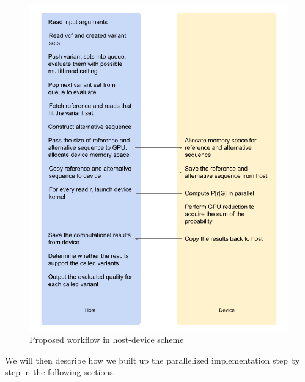 \documentclass{PHlab-thesis}
\begin{document}
\begin{figure}
	\centering
	\includegraphics[scale=0.8]{figures/proposed.png}
	\caption{Proposed workflow in host-device scheme}
	\label{fig:prop} %
\end{figure}

We will then describe how we built up the parallelized implementation step by step in the following sections.
\end{document}
